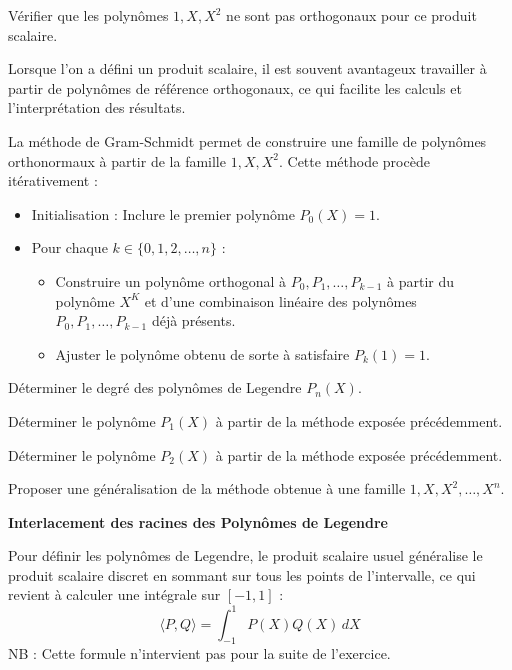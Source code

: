 \documentclass[10pt,a4paper]{article}
\begin{document}
\q Vérifier que les polynômes \( 1, X, X^2 \) ne sont pas orthogonaux pour ce produit scalaire.

\bigskip
Lorsque l'on a défini un produit scalaire, il est souvent avantageux travailler à partir de
polynômes de référence orthogonaux, ce qui facilite les calculs et l'interprétation des résultats.

La méthode de Gram-Schmidt permet de construire une famille de polynômes orthonormaux à partir de la
famille ${1, X, X^2}$. Cette méthode procède itérativement :
\begin{itemize}
   \item Initialisation : Inclure le premier polynôme $P_0(X) = 1$.
   \item Pour chaque $k \in \{0, 1, 2, \dots, n\}$ :
   \begin{itemize}
      \item Construire un polynôme orthogonal à $P_0, P_1, \dots, P_{k-1}$ à partir du polynôme
      $X^K$ et d'une combinaison linéaire des polynômes $P_0, P_1, \dots, P_{k-1}$ déjà présents.
      \item Ajuster le polynôme obtenu de sorte à satisfaire $P_k(1) = 1$.
   \end{itemize}
\end{itemize}

\q Déterminer le degré des polynômes de Legendre $P_n(X)$.

\q Déterminer le polynôme $P_1(X)$ à partir de la méthode exposée précédemment.

\q Déterminer le polynôme $P_2(X)$ à partir de la méthode exposée précédemment.

\bigskip \q Proposer une généralisation de la méthode obtenue à une famille ${1, X, X^2, \dots,
X^n}$.


\bigskip
\textbf{Interlacement des racines des Polynômes de Legendre}

Pour définir les polynômes de Legendre, le produit scalaire usuel généralise le produit scalaire
discret en sommant sur tous les points de l'intervalle, ce qui revient à calculer une intégrale sur
$[-1,1]$ :
\[
\langle P, Q \rangle = \int_{-1}^{1} P(X) Q(X) \, dX
\]
\footnotesize NB : Cette formule n'intervient pas pour la suite de l'exercice. \normalsize
\end{document}
